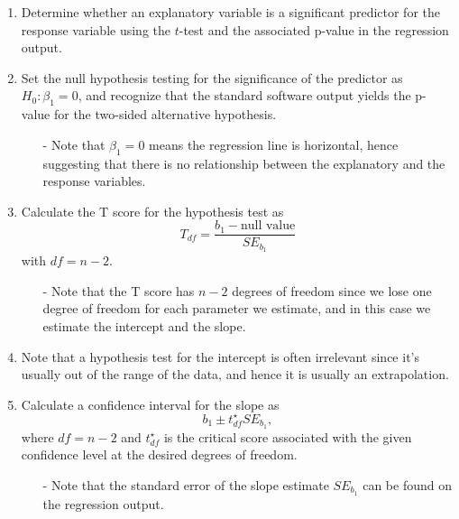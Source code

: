 \documentclass[11pt]{article}
\begin{document}
\vspace{0.48cm}

%

\begin{enumerate}[resume]
\renewcommand\labelenumi{\textcolor{light}{\textbf{LO \theenumi.}}}

\item Determine whether an explanatory variable is a significant predictor for the response variable using the $t$-test and the associated p-value in the regression output.

\item Set the null hypothesis testing for the significance of the predictor as $H_0: \beta_1 = 0$, and recognize that the standard software output yields the p-value for the two-sided alternative hypothesis.
\begin{itemize}
\item[-] Note that $\beta_1 = 0$ means the regression line is horizontal, hence suggesting that there is no relationship between the explanatory and the response variables.
\end{itemize}

\item Calculate the T score for the hypothesis test as 
\[ T_{df} = \frac{b_1 - \text{null value}}{SE_{b_1}} \]
with $df = n - 2$.
\begin{itemize}
\item[-] Note that the T score has $n - 2$ degrees of freedom since we lose one degree of freedom for each parameter we estimate, and in this case we estimate the intercept and the slope.
\end{itemize}

\item Note that a hypothesis test for the intercept is often irrelevant since it's usually out of the range of the data, and hence it is usually an extrapolation.

\item Calculate a confidence interval for the slope as
\[ b_1 \pm t^\star_{df} SE_{b_1}, \]
where $df = n - 2$ and $t^\star_{df}$ is the critical score associated with the given confidence level at the desired degrees of freedom.
\begin{itemize}
\item[-] Note that the standard error of the slope estimate $SE_{b_1}$ can be found on the regression output.
\end{itemize}

\end{enumerate}
\end{document}
